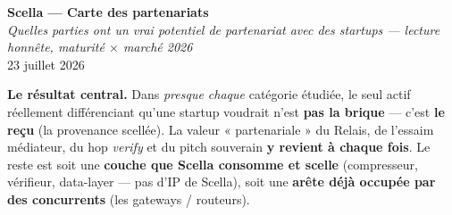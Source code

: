 \documentclass[11pt]{article}
\begin{document}
\begin{center}
{\LARGE\bfseries\color{navy} Scella — Carte des partenariats}\\[3pt]
{\color{grey}\itshape Quelles parties ont un vrai potentiel de partenariat avec des startups —
lecture honnête, maturité $\times$ marché 2026}\\[3pt]
{\small\color{grey}23 juillet 2026}
\end{center}
\vspace{2pt}

\begin{these}
\textbf{Le résultat central.} Dans \emph{presque chaque} catégorie étudiée, le seul actif réellement
différenciant qu'une startup voudrait n'est \textbf{pas la brique} — c'est \textbf{le reçu} (la
provenance scellée). La valeur « partenariale » du Relais, de l'essaim médiateur, du hop \emph{verify}
et du pitch souverain \textbf{y revient à chaque fois}. Le reste est soit une \textbf{couche que Scella
consomme et scelle} (compresseur, vérifieur, data-layer — pas d'IP de Scella), soit une \textbf{arête
déjà occupée par des concurrents} (les gateways / routeurs).
\end{these}
\end{document}
